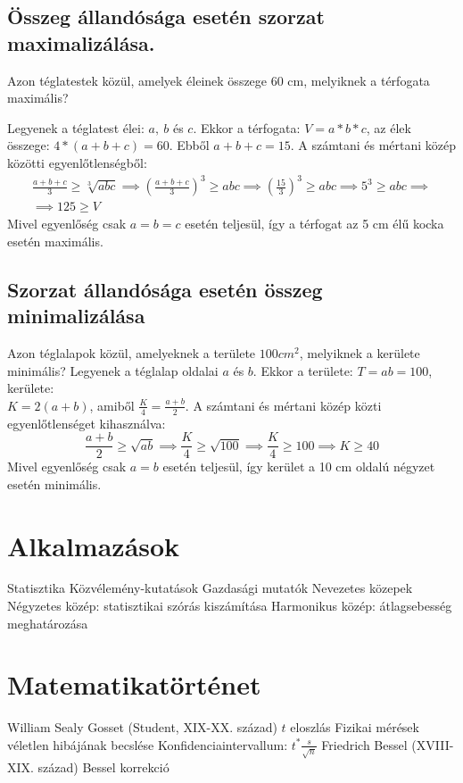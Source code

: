 \documentclass[twoside,12pt]{report}
\theoremstyle{definition}
\begin{document}
	\subsection{Összeg állandósága esetén szorzat maximalizálása.}
	Azon téglatestek közül, amelyek éleinek összege 60 cm, melyiknek a térfogata maximális?
	
	Legyenek a téglatest élei: $a,\ b$ és $c$. Ekkor a térfogata: $V=a*b*c$, az élek összege: $4*(a+b+c)=60$. Ebből $a+b+c=15$. A számtani és mértani közép közötti egyenlőtlenségből:
	\begin{gather*}
		\frac{a+b+c}{3}\ge\sqrt[3]{abc}\implies \left(\frac{a+b+c}{3}\right)^3\ge abc\implies \left(\frac{15}{3}\right)^3\ge abc\implies 5^3\ge abc\implies\\
		\implies 125\ge V
	\end{gather*}
	Mivel egyenlőség csak $a=b=c$ esetén teljesül, így a térfogat az 5 cm élű kocka esetén maximális.
	\subsection{Szorzat állandósága esetén összeg minimalizálása}
	Azon téglalapok közül, amelyeknek a területe $100 cm^2$, melyiknek a kerülete minimális?
	Legyenek a téglalap oldalai $a$ és $b$. Ekkor a területe: $T=ab=100$, kerülete: \\
	$K=2(a+b)$, amiből $\frac{K}{4}=\frac{a+b}{2}$. A számtani és mértani közép közti egyenlőtlenséget kihasználva:
	\begin{equation*}
		\frac{a+b}{2}\ge\sqrt{ab}\implies\frac{K}{4}\ge\sqrt{100}\implies\frac{K}{4}\ge 100\implies K\ge 40
	\end{equation*}
	Mivel egyenlőség csak $a=b$ esetén teljesül, így kerület a 10 cm oldalú négyzet esetén minimális.
\section{Alkalmazások}
	\begin{outline}
		\1 Statisztika
			\2 Közvélemény-kutatások
			\2 Gazdasági mutatók
		\1 Nevezetes közepek
			\2 Négyzetes közép: statisztikai szórás kiszámítása
			\2 Harmonikus közép: átlagsebesség meghatározása
	\end{outline}
\section{Matematikatörténet}
	\begin{outline}
		\1 William Sealy Gosset (Student, XIX-XX. század)
			\2 $t$ eloszlás
			\2 Fizikai mérések véletlen hibájának becslése
			\2 Konfidenciaintervallum: $t^*\frac{s}{\sqrt{n}}$
		\1 Friedrich Bessel (XVIII-XIX. század)
			\2 Bessel korrekció
	\end{outline}
\end{document}
